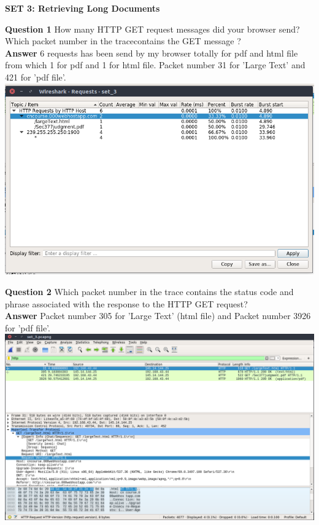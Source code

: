 \documentclass[14pt]{extarticle}
\begin{document}
    \begin{center}
        {\large \textbf{SET 3: Retrieving Long Documents }}
    \end{center}

    \noindent
    \textbf{\large Question 1}
    How  many  HTTP  GET  request  messages  did  your  browser  send? 
    Which  packet  number  in  the  tracecontains the GET message ?\\
    \textbf{\large Answer}
    6 requests has been send by my browser totally for pdf and html file from which 1 for pdf and 1 for html file. Packet number 31 for 'Large Text' and 421 for 'pdf file'.\\[10pt]
    \includegraphics[scale=0.48]{s3_1}\\[10pt]
    \vspace{1cm}

    \noindent
    \textbf{\large Question 2}
    Which packet number in the trace contains the status code
     and phrase associated with the response to the HTTP GET request?\\
    \textbf{\large Answer}
    Packet number 305 for 'Large Text' (html file) and Packet number 3926 for 'pdf file'.\\[10pt]
    \includegraphics[scale=0.40]{s3}\\[10pt]
    \vspace{1cm}
\end{document}
